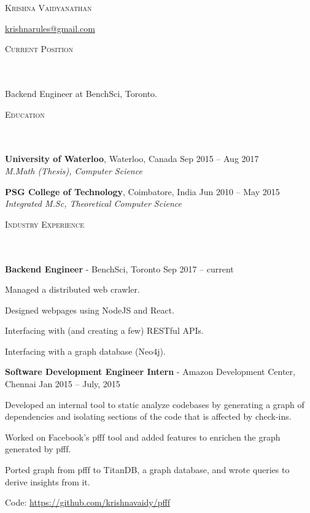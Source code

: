 \documentclass{article}
\newcommand{\header}[1]{{
\hspace*{-15pt}\vspace*{6pt} \textsc{#1}} \vspace*{-6pt} 
\lineunder
}
\newcommand{\lineunder}{
\vspace*{-8pt} \\ \hspace*{-18pt} 
\hrulefill \\
}
\newcommand{\content}{
\vspace*{2pt}%
}
\newcommand{\college}[5]{\vspace*{2pt}%
#1 \hfill #2 \\ #3 \hfill #4
\vspace*{5pt}
}
\newcommand{\employer}[4]{{
\vspace*{2pt}%
\textbf{#1} - #2 \hfill #3\\ #4 \vspace*{2pt}}
}
\renewcommand{\labelitemii}{
$\vcenter{\hbox{\tiny$\bullet$}}$\hspace*{-3pt}
}
\newenvironment{bullet-list-minor}{
\begin{list}{\labelitemii}{\setlength\leftmargin{15pt} 
\topsep 0pt \itemsep -2pt}}{\vspace*{4pt}\end{list}
}
\begin{document}
\small
\smallskip

\begin{center}
    {\large \scshape{Krishna Vaidyanathan}}
\end{center}
    \hfill \href{mailto:krishnarules@gmail.com}{krishnarules@gmail.com} \\
\vspace{15pt}

\header{Current Position}
    \content{Backend Engineer at BenchSci, Toronto.}


\vspace*{4pt}%
\header{Education}
    \college{\textbf{University of Waterloo}, Waterloo, Canada}{Sep 2015 -- Aug 2017}
    {\textit{M.Math (Thesis), Computer Science}}{}\\

    \college{\textbf{PSG College of Technology}, Coimbatore, India}{Jun 2010 -- May 2015}
    {\textit{Integrated M.Sc, Theoretical Computer Science}}{}\\

\vspace*{4pt}%
\header{Industry Experience}
    \employer{Backend Engineer}{BenchSci,
        Toronto}{Sep 2017 -- current}{}
	\begin{bullet-list-minor}
        \item Managed a distributed web crawler.
        \item Designed webpages using NodeJS and React.
        \item Interfacing with (and creating a few) RESTful APIs.
        \item Interfacing with a graph database (Neo4j).
    \end{bullet-list-minor}
    \employer{Software Development Engineer Intern}{Amazon Development Center,
        Chennai}{Jan 2015 -- July,
        2015}{}
	\begin{bullet-list-minor}
        \item Developed an internal tool to static analyze codebases by
            generating a graph of dependencies and isolating sections of the
            code that is affected by check-ins.
        \item Worked on Facebook's pfff tool and added features to enrichen the
            graph generated by pfff.
        \item Ported graph from pfff to TitanDB, a graph database, and wrote
            queries to derive insights from it.
        \item Code: \url{https://github.com/krishnavaidy/pfff}
    \end{bullet-list-minor}
\end{document}
